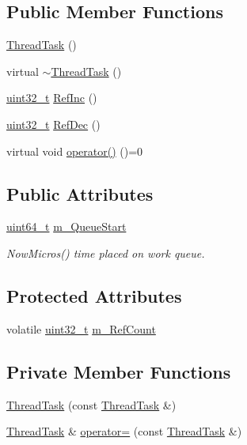 \subsection*{Public Member Functions}
\begin{DoxyCompactItemize}
\item 
\hyperlink{classleveldb_1_1_thread_task_a022062e8b04f38dc2422c3e6725bff8b}{Thread\+Task} ()
\item 
virtual \hyperlink{classleveldb_1_1_thread_task_a0ce1739c4b93a113659bfc013a95f54f}{$\sim$\+Thread\+Task} ()
\item 
\hyperlink{stdint_8h_a435d1572bf3f880d55459d9805097f62}{uint32\+\_\+t} \hyperlink{classleveldb_1_1_thread_task_a9e990c2a42edda1628a44396b1255071}{Ref\+Inc} ()
\item 
\hyperlink{stdint_8h_a435d1572bf3f880d55459d9805097f62}{uint32\+\_\+t} \hyperlink{classleveldb_1_1_thread_task_af2ab24134ff01ad440222c3109dc5db2}{Ref\+Dec} ()
\item 
virtual void \hyperlink{classleveldb_1_1_thread_task_a0d013b69001558efd2d32519ceecb51c}{operator()} ()=0
\end{DoxyCompactItemize}
\subsection*{Public Attributes}
\begin{DoxyCompactItemize}
\item 
\hyperlink{stdint_8h_aaa5d1cd013383c889537491c3cfd9aad}{uint64\+\_\+t} \hyperlink{classleveldb_1_1_thread_task_ad8bd1c18e4dca18b192dab8574b408c4}{m\+\_\+\+Queue\+Start}
\begin{DoxyCompactList}\small\item\em Now\+Micros() time placed on work queue. \end{DoxyCompactList}\end{DoxyCompactItemize}
\subsection*{Protected Attributes}
\begin{DoxyCompactItemize}
\item 
volatile \hyperlink{stdint_8h_a435d1572bf3f880d55459d9805097f62}{uint32\+\_\+t} \hyperlink{classleveldb_1_1_thread_task_aa5ae24ffb26e826b411ef1f452004201}{m\+\_\+\+Ref\+Count}
\end{DoxyCompactItemize}
\subsection*{Private Member Functions}
\begin{DoxyCompactItemize}
\item 
\hyperlink{classleveldb_1_1_thread_task_a1b8e0b6a25c6bf7a7c32a4c77f80d802}{Thread\+Task} (const \hyperlink{classleveldb_1_1_thread_task}{Thread\+Task} \&)
\item 
\hyperlink{classleveldb_1_1_thread_task}{Thread\+Task} \& \hyperlink{classleveldb_1_1_thread_task_a06eee64da2f8bc92644c8b7550b8b6fc}{operator=} (const \hyperlink{classleveldb_1_1_thread_task}{Thread\+Task} \&)
\end{DoxyCompactItemize}


